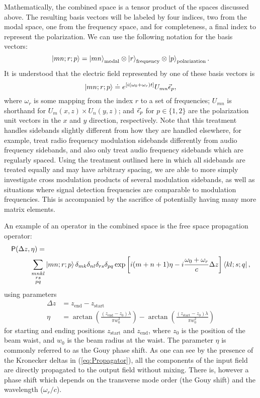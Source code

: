 Mathematically, the combined space is a tensor product of the spaces discussed above. %
The resulting basis vectors will be labeled by four indices, two from the modal space, one from the frequency space, and for completeness, a final index to represent the polarization. %
We can use the following notation for the basis vectors:
\begin{equation}
\left| mn;r;p \right>=\left| mn \right>_{\text{modal}}\otimes\left| r \right>_{\text{frequency}}\otimes\left| p \right>_{\text{polarization}}.
\end{equation}
It is understood that the electric field represented by one of these basis vectors is
\[
\left| mn;r;p \right> \doteq e^{\left[ i\left( \omega_0+\omega_r\right)t\right]} U_{mn}\vec{\epsilon}_p,
\]
where $\omega_r$ is some mapping from the index $r$ to a set of frequencies; $U_{mn}$ is shorthand for $U_m(x,z)\times U_n(y,z)$; and $\vec{\epsilon}_p$ for $p\in \{1,2\}$ are the polarization unit vectors in the $x$ and $y$ direction, respectively. %
Note that this treatment handles sidebands slightly different from how they are handled elsewhere, for example, \citet{Sigg:00} treat radio frequency modulation sidebands differently from audio frequency sidebands, and also only treat audio frequency sidebands which are regularly spaced. %
Using the treatment outlined here in which all sidebands are treated equally and may have arbitrary spacing, we are able to more simply investigate cross modulation products of several modulation sidebands, as well as situations where signal detection frequencies are comparable to modulation frequencies. %
This is accompanied by the sacrifice of potentially having many more matrix elements.

An example of an operator in the combined space is the free space propagation operator:
\begin{align}
\label{eq:Propagator}
\mathsf{P}(\Delta z,\eta) = & \\
\sum_{\substack{mnkl\\rs\\pq}}& \left| mn;r;p \right>
\delta_{mk}\delta_{nl}\delta_{rs}\delta_{pq}
\exp  \left[i(m+n+1)\eta
-i\frac{\omega_0+\omega_r}{c}\Delta z\right] 
\left< kl;s;q \right|, \notag
\end{align}
using parameters
\begin{align*}
\Delta z &= z_{\text{end}}-z_{\text{start}} \\
\eta &= \arctan \left( \frac{(z_{\text{end}}-z_0)\lambda}{\pi w_0^2}\right)- 
        \arctan \left( \frac{(z_{\text{start}}-z_0)\lambda}{\pi w_0^2}\right)
\end{align*}
for starting and ending positions $z_{\text{start}}$ and $z_{\text{end}}$, where $z_0$ is the position of the beam waist, and $w_0$ is the beam radius at the waist. %
The parameter $\eta$ is commonly referred to as the Gouy phase shift. %
As one can see by the presence of the Kronecker deltas in (\ref{eq:Propagator}), all the components of the input field are directly propagated to the output field without mixing. %
There is, however a phase shift which depends on the transverse mode order (the Gouy shift) and the wavelength ($\omega_r/c$).

